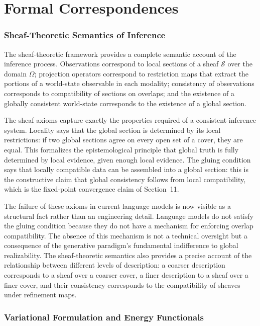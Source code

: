 \documentclass[11pt, oneside]{article}
\begin{document}
\part{Formal Correspondences}

\section{Sheaf-Theoretic Semantics of Inference}

The sheaf-theoretic framework provides a complete semantic account of the inference process. Observations correspond to local sections of a sheaf $\mathcal{S}$ over the domain $\Omega$; projection operators correspond to restriction maps that extract the portions of a world-state observable in each modality; consistency of observations corresponds to compatibility of sections on overlaps; and the existence of a globally consistent world-state corresponds to the existence of a global section.

The sheaf axioms capture exactly the properties required of a consistent inference system. Locality says that the global section is determined by its local restrictions: if two global sections agree on every open set of a cover, they are equal. This formalizes the epistemological principle that global truth is fully determined by local evidence, given enough local evidence. The gluing condition says that locally compatible data can be assembled into a global section: this is the constructive claim that global consistency follows from local compatibility, which is the fixed-point convergence claim of Section~11.

The failure of these axioms in current language models is now visible as a structural fact rather than an engineering detail. Language models do not satisfy the gluing condition because they do not have a mechanism for enforcing overlap compatibility. The absence of this mechanism is not a technical oversight but a consequence of the generative paradigm's fundamental indifference to global realizability. The sheaf-theoretic semantics also provides a precise account of the relationship between different levels of description: a coarser description corresponds to a sheaf over a coarser cover, a finer description to a sheaf over a finer cover, and their consistency corresponds to the compatibility of sheaves under refinement maps.

\section{Variational Formulation and Energy Functionals}
\end{document}
